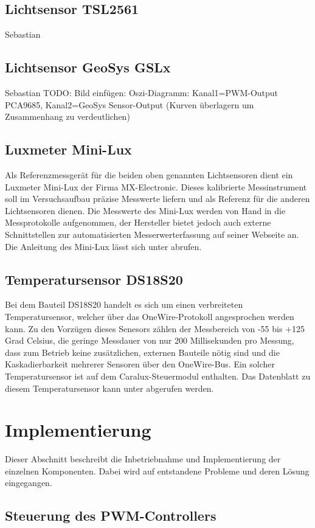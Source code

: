 \documentclass[a4paper,12pt]{scrartcl}
\begin{document}
\subsection{Lichtsensor TSL2561}
Sebastian
\subsection{Lichtsensor GeoSys GSLx}
Sebastian
TODO: Bild einf\"ugen: Oszi-Diagramm: Kanal1=PWM-Output PCA9685, Kanal2=GeoSys Sensor-Output (Kurven \"uberlagern um Zusammenhang zu verdeutlichen)

\subsection{Luxmeter Mini-Lux}
Als Referenzmessgerät für die beiden oben genannten Lichtsensoren dient ein Luxmeter Mini-Lux der Firma MX-Electronic. Dieses kalibrierte Messinstrument soll
im Versuchsaufbau präzise Messwerte liefern und als Referenz für die anderen Lichtsensoren dienen. Die Messwerte des Mini-Lux werden von Hand in die
Messprotokolle aufgenommen, der Hersteller bietet jedoch auch externe Schnittstellen zur automatisierten Messerwerterfassung auf seiner Webseite an. Die
Anleitung des Mini-Lux lässt sich unter \cite{specminilux} abrufen. 

\subsection{Temperatursensor DS18S20}
Bei dem Bauteil DS18S20 handelt es sich um einen verbreiteten Temperatursensor,
welcher über das OneWire-Protokoll angesprochen werden kann. Zu den Vorzügen
dieses Senesors zählen der Messbereich von -55 bis +125 Grad Celsius, die
geringe Messdauer von nur 200 Millisekunden pro Messung, dass zum Betrieb keine
zusätzlichen, externen Bauteile nötig sind und die Kaskadierbarkeit mehrerer
Sensoren über den OneWire-Bus. Ein solcher Temperatursensor ist auf dem
Caralux-Steuermodul enthalten. Das Datenblatt zu diesem Temperatursensor kann
unter \cite{specds1820} abgerufen werden.

\clearpage
\section{Implementierung}
Dieser Abschnitt beschreibt die Inbetriebnahme und Implementierung der einzelnen Komponenten. Dabei wird auf entstandene Probleme und deren Lösung eingegangen. 
\subsection{Steuerung des PWM-Controllers}
\end{document}
